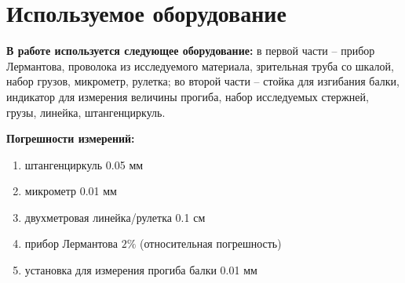\documentclass[a4paper,12pt]{article} %
\begin{document}
    \section{Используемое оборудование}
    \textbf{В работе используется следующее оборудование:} в первой части -- прибор Лермантова, проволока из исследуемого материала, зрительная труба со шкалой,
    набор грузов, микрометр, рулетка; во второй части -- стойка для
    изгибания балки, индикатор для измерения величины прогиба, набор
    исследуемых стержней, грузы, линейка, штангенциркуль.

    \textbf{Погрешности измерений:}  \begin{enumerate}
        \item штангенциркуль 0.05 мм
        \item микрометр 0.01 мм
        \item двухметровая линейка/рулетка 0.1 см
        \item прибор Лермантова $ 2\% $ (относительная погрешность)
        \item установка для измерения прогиба балки 0.01 мм 
    \end{enumerate}
\end{document}
